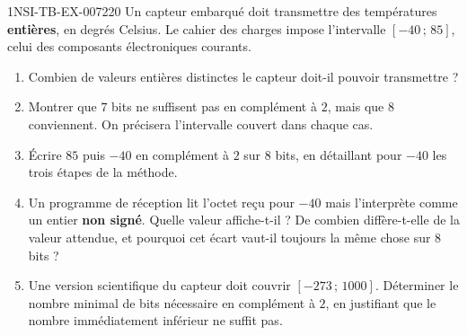 \begin{exercice}{1NSI-TB-EX-007}{2}{20}
Un capteur embarqué doit transmettre des températures \textbf{entières}, en
degrés Celsius. Le cahier des charges impose l'intervalle
$[-40\,;\,85]$, celui des composants électroniques courants.
\begin{enumerate}
  \item Combien de valeurs entières distinctes le capteur doit-il pouvoir
    transmettre ?
  \item Montrer que $7$ bits ne suffisent pas en complément à $2$, mais que $8$
    conviennent. On précisera l'intervalle couvert dans chaque cas.
  \item Écrire $85$ puis $-40$ en complément à $2$ sur $8$ bits, en détaillant
    pour $-40$ les trois étapes de la méthode.
  \item Un programme de réception lit l'octet reçu pour $-40$ mais l'interprète
    comme un entier \textbf{non signé}. Quelle valeur affiche-t-il ? De combien
    diffère-t-elle de la valeur attendue, et pourquoi cet écart vaut-il toujours
    la même chose sur $8$ bits ?
  \item Une version scientifique du capteur doit couvrir $[-273\,;\,1000]$.
    Déterminer le nombre minimal de bits nécessaire en complément à $2$, en
    justifiant que le nombre immédiatement inférieur ne suffit pas.
\end{enumerate}
\end{exercice}
